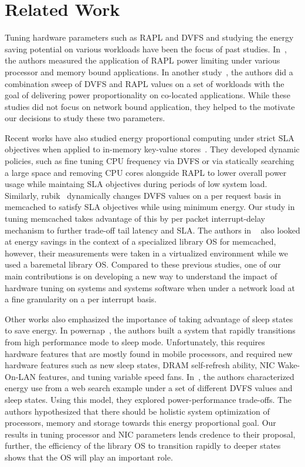 \section{Related Work}
\label{sec:related}

Tuning hardware parameters such as RAPL and DVFS and studying the energy saving potential on various workloads have been the focus of past studies. In~\cite{10.1145/3177754, zhang2015quantitative}, the authors measured the application of RAPL power limiting under various processor and memory bound applications. In another study~\cite{10.1145/3302424.3303981}, the authors did a combination sweep of DVFS and RAPL values on a set of workloads with the goal of delivering power proportionality on co-located applications. While these studies did not focus on network bound application, they helped to the motivate our decisions to study these two parameters.

Recent works have also studied energy proportional computing under strict SLA objectives when applied to in-memory key-value stores~\cite{10.1145/2678373.2665718, 10.1145/2806777.2806848}. They developed dynamic policies, such as fine tuning CPU frequency via DVFS or via statically searching a large space and removing CPU cores alongside RAPL to lower overall power usage while maintaing SLA objectives during periods of low system load.
Similarly, rubik~\cite{rubik} dynamically changes DVFS values on a per request basis in memcached to satisfy SLA objectives while using minimum energy. Our study in tuning memcached takes advantage of this by per packet interrupt-delay mechanism to further trade-off tail latency and SLA. The authors in ~\cite{10.1145/2806777.2806848} also looked at energy savings in the context of a specialized library OS for memcached, however, their measurements were taken in a virtualized environment while we used a baremetal library OS. Compared to these previous studies, one of our main contributions is on developing a new way to understand the impact of hardware tuning on systems and systems software when under a network load at a fine granularity on a per interrupt basis.

Other works also emphasized the importance of taking advantage of sleep states to save energy. In powernap~\cite{powernap}, the authors built a system that rapidly transitions from high performance mode to sleep mode. Unfortunately, this requires hardware features that are mostly found in mobile processors, and required new hardware features such as new sleep states, DRAM self-refresh ability, NIC Wake-On-LAN features, and tuning variable speed fans. In~\cite{10.1145/2024723.2000103}, the authors characterized energy use from a web search example under a set of different DVFS values and sleep states. Using this model, they explored power-performance trade-offs. The authors hypothesized that there should be holistic system optimization of processors, memory and storage towards this energy proportional goal. Our results in tuning processor and NIC parameters lends credence to their proposal, further, the efficiency of the library OS to transition rapidly to deeper states shows that the OS will play an important role.

